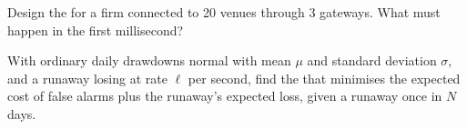 \begin{interviewq}\label{iq:hf:risk-controls:5}
Design the  for a firm connected to 20 venues through 3 gateways. What must happen in the first millisecond?
\end{interviewq}

\begin{interviewq}\label{iq:hf:risk-controls:6}
With ordinary daily drawdowns normal with mean $\mu$ and standard deviation $\sigma$, and a runaway losing at rate $\ell$ per second, find the  that minimises the expected cost of false alarms plus the runaway's expected loss, given a runaway once in $N$ days.
\end{interviewq}
